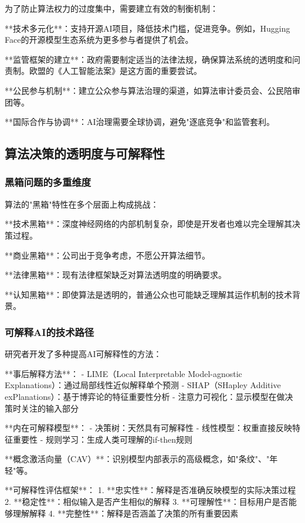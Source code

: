 为了防止算法权力的过度集中，需要建立有效的制衡机制：

**技术多元化**：支持开源AI项目，降低技术门槛，促进竞争。例如，Hugging Face的开源模型生态系统为更多参与者提供了机会。

**监管框架的建立**：政府需要制定适当的法律法规，确保算法系统的透明度和问责制。欧盟的《人工智能法案》是这方面的重要尝试。

**公民参与机制**：建立公众参与算法治理的渠道，如算法审计委员会、公民陪审团等。

**国际合作与协调**：AI治理需要全球协调，避免"逐底竞争"和监管套利。

\subsection{算法决策的透明度与可解释性}

\subsubsection{黑箱问题的多重维度}

算法的"黑箱"特性在多个层面上构成挑战：

**技术黑箱**：深度神经网络的内部机制复杂，即使是开发者也难以完全理解其决策过程。

**商业黑箱**：公司出于竞争考虑，不愿公开算法细节。

**法律黑箱**：现有法律框架缺乏对算法透明度的明确要求。

**认知黑箱**：即使算法是透明的，普通公众也可能缺乏理解其运作机制的技术背景。

\subsubsection{可解释AI的技术路径}

研究者开发了多种提高AI可解释性的方法：

**事后解释方法**：
- LIME（Local Interpretable Model-agnostic Explanations）：通过局部线性近似解释单个预测
- SHAP（SHapley Additive exPlanations）：基于博弈论的特征重要性分析
- 注意力可视化：显示模型在做决策时关注的输入部分

**内在可解释模型**：
- 决策树：天然具有可解释性
- 线性模型：权重直接反映特征重要性
- 规则学习：生成人类可理解的if-then规则

**概念激活向量（CAV）**：识别模型内部表示的高级概念，如"条纹"、"年轻"等。

\begin{center}
**可解释性评估框架**：
1. **忠实性**：解释是否准确反映模型的实际决策过程
2. **稳定性**：相似输入是否产生相似的解释
3. **可理解性**：目标用户是否能够理解解释
4. **完整性**：解释是否涵盖了决策的所有重要因素
\end{center}

